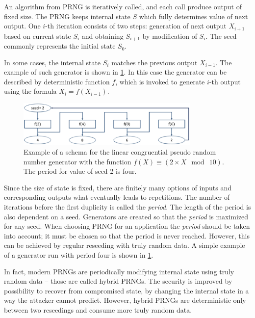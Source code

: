 \documentclass[
    digital,    %
    oneside,    %
    color,
    11pt,
    nocover,
    notable,
    nolof,
    nolot,
    final
]{fithesis3}
\renewcommand\_{\textunderscore\allowbreak}
\begin{document}
An algorithm from PRNG is iteratively called, and each call produce output of fixed size. The PRNG keeps internal state $S$ which fully determines value of next output. One $i$-th iteration consists of two steps: generation of next output $X_{i + 1}$ based on current state $S_{i}$ and obtaining $S_{i+1}$ by modification of $S_{i}$. The seed commonly represents the initial state $S_{0}$.

In some cases, the internal state $S_i$ matches the previous output $X_{i - 1}$. The example of such generator is shown in \cref{fig:prng}. In this case the generator can be described by deterministic function $f$, which is invoked to generate $i$-th output using the formula $X_i = f(X_{i - 1})$.

\begin{figure}[h]
	\centering
	\includegraphics[width=0.8\textwidth]{./images/pictures/prng.png}
	\caption{Example of a schema for the linear congruential pseudo random number generator with the function $f(X) \equiv \left(2 \times X~\bmod~10 \right)$. The period for value of seed 2 is four.}
	\label{fig:prng}
\end{figure}

Since the size of state is fixed, there are finitely many options of inputs and corresponding outputs what eventually leads to repetitions. The number of iterations before the first duplicity is called the \textit{period}. The length of the period is also dependent on a seed. Generators are created so that the \textit{period} is maximized for any seed. When choosing PRNG for an application the \textit{period} should be taken into account; it must be chosen so that the period is never reached. However, this can be achieved by regular reseeding with truly random data. A simple example of a generator run with period four is shown in \cref{fig:prng}.

In fact, modern PRNGs are periodically modifying internal state using truly random data -- those are called hybrid PRNGs. The security is improved by possibility to recover from compromised state, by changing the internal state in a way the attacker cannot predict. However, hybrid PRNGs are deterministic only between two reseedings and consume more truly random data. \cite{krhovjak2009cryptographic}
\end{document}
